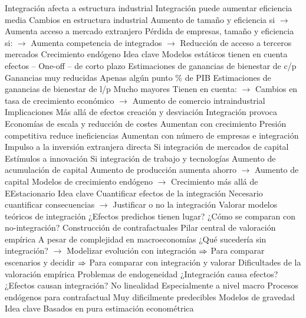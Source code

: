 \documentclass{nuevotema}
\begin{document}
\begin{esquemal}
				\4 Integración afecta a estructura industrial
				\4 Integración puede aumentar eficiencia media
				\4 Cambios en estructura industrial
				\4[] Aumento de tamaño y eficiencia si
				\4[] $\to$ Aumenta acceso a mercado extranjero
				\4[] Pérdida de empresas, tamaño y eficiencia si:
				\4[] $\to$ Aumenta competencia de integrados
				\4[] $\to$ Reducción de acceso a terceros mercados
		\2 Crecimiento endógeno
			\3 Idea clave
				\4 Modelos estáticos tienen en cuenta efectos
				\4[] -- One-off
				\4[] -- de corto plazo
				\4 Estimaciones de ganancias de bienestar de c/p
				\4[] Ganancias muy reducidas
				\4[] Apenas algún punto \% de PIB
				\4 Estimaciones de ganancias de bienestar de l/p
				\4[] Mucho mayores
				\4[] Tienen en cuenta:
				\4[] $\to$ Cambios en tasa de crecimiento económico
				\4[] $\to$ Aumento de comercio intraindustrial
			\3 Implicaciones
				\4 Más allá de efectos creación y desviación
				\4 Integración provoca
				\4[i] Economías de escala y reducción de costes
				\4[] Aumentan con crecimiento
				\4[ii] Presión competitiva reduce ineficiencias
				\4[] Aumentan con número de empresas e integración
				\4[iii] Impulso a la inversión extranjera directa
				\4[] Si integración de mercados de capital
				\4[iv] Estímulos a innovación
				\4[] Si integración de trabajo y tecnologías
				\4[v] Aumento de acumulación de capital
				\4[] Aumento de producción aumenta ahorro
				\4[] $\to$ Aumento de capital
				\4[] Modelos de crecimiento endógeno
				\4[] $\to$ Crecimiento más allá de EEstacionario
	\1 
		\2 Idea clave
			\3 Cuantificar efectos de la integración
				\4[] Necesario cuantificar consecuencias
				\4[] $\to$ Justificar o no la integración
				\4 Valorar modelos teóricos de integración
				\4[] ¿Efectos predichos tienen lugar?
				\4[] ¿Cómo se comparan con no-integración?
			\3 Construcción de contrafactuales
				\4 Pilar central de valoración empírica
				\4[] A pesar de complejidad en macroeconomías
				\4 ¿Qué sucedería sin integración?
				\4[] $\to$ Modelizar evolución con integración
				\4[] $\Rightarrow$ Para comparar escenarios y decidir
				\4[] $\Rightarrow$ Para comparar con integración y valorar
			\3 Dificultades de la valoración empírica
				\4 Problemas de endogeneidad
				\4[] ¿Integración causa efectos?
				\4[] ¿Efectos causan integración?
				\4 No linealidad
				\4[] Especialmente a nivel macro
				\4 Procesos endógenos para contrafactual
				\4[] Muy dificilmente predecibles
		\2 Modelos de gravedad
			\3 Idea clave
				\4 Basados en pura estimación econométrica

\end{esquemal}
\end{document}
